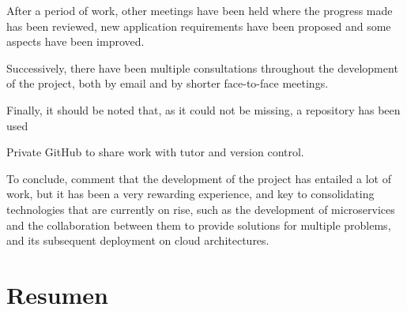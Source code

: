 After a period of work, other meetings have been held where the progress made has been reviewed, new application requirements have been proposed and some aspects have been improved.

Successively, there have been multiple consultations throughout the development of the project, both by email and by shorter face-to-face meetings.

Finally, it should be noted that, as it could not be missing, a repository has been used

Private GitHub to share work with tutor and version control.

To conclude, comment that the development of the project has entailed a lot of work, but it has been a very rewarding experience, and key to consolidating technologies that are currently on rise, such as the development of microservices and the collaboration between them to provide solutions for multiple problems, and its subsequent deployment on cloud architectures.

\chapter*{Resumen\label{00summary}}


